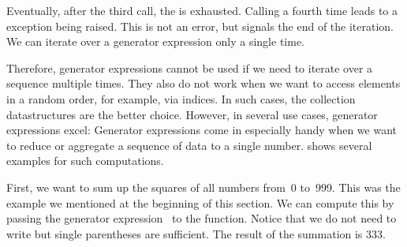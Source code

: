 Eventually, after the third  call, the  is exhausted.
Calling  a fourth time leads to a  exception being raised.
This is not an error, but signals the end of the iteration.
We can iterate over a generator expression only a single time.

Therefore, generator expressions cannot be used if we need to iterate over a sequence multiple times.
They also do not work when we want to access elements in a random order, for example, via indices.
In such cases, the collection datastructures are the better choice.
However, in several use cases, generator expressions excel:%
%
%
%
%
%
%
Generator expressions come in especially handy when we want to reduce or aggregate a sequence of data to a single number.
 shows several examples for such computations.

First, we want to sum up the squares of all numbers from~0 to~999.
This was the example we mentioned at the beginning of this section.
We can compute this by passing the generator expression~ to the  function.
Notice that we do not need to write  but single parentheses are sufficient.
The result of the summation is 333.

